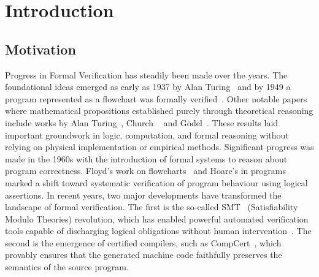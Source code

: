 
%

\chapter{Introduction}
\label{cha:introduction}


\section{Motivation}
\label{sec:Motivation}


Progress in Formal Verification has steadily been made over the years. 
The foundational ideas emerged as early as 1937 by Alan Turing~\cite{Turing37} and by 1949 a program
represented as a flowchart was formally verified~\cite{early-proof}. Other notable papers where mathematical propositions 
established purely through theoretical reasoning include works by Alan Turing~\cite{Turing38}, Church
~\cite{church-unsolvableproblemof-1936} and Gödel~\cite{ZACH2005917}. These results laid important 
groundwork in logic, computation, and formal reasoning without relying on physical implementation or empirical methods.
Significant progress was made in the 1960s with the introduction of formal systems to reason about program correctness. 
Floyd's work on flowcharts~\cite{Floyd93} and Hoare's in programs~\cite{Hoare69} marked a shift toward systematic verification of 
program behaviour using logical assertions.
In recent years, two major developments have transformed the landscape of formal verification. The first is the so-called SMT~\cite{abs-1711-10641} 
(Satisfiability Modulo Theories) revolution, which has enabled powerful automated verification tools capable of discharging 
logical obligations without human intervention~\cite{Barrett2018}. The second is the emergence of certified compilers, such as 
CompCert~\cite{Leroy09-back-end}, which provably ensures that the generated machine code faithfully preserves the semantics of the source 
program.

